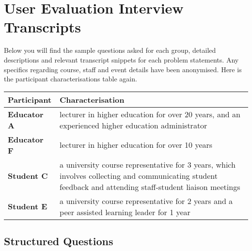 
\chapter{User Evaluation Interview Transcripts}

Below you will find the sample questions asked for each group, detailed descriptions and relevant transcript
snippets for each problem statements.
Any specifics regarding course, staff and event details have been anonymised.
Here is the participant characterisations table again.

\begin{table}[!h]
	\centering
	\begin{tabularx}{\textwidth}{>{\bfseries}lX}
		Participant & Characterisation                                                                    \\
		\toprule
		Educator A  & lecturer in higher education for over 20 years, and an experienced higher education
		administrator                                                                                     \\\midrule
		Educator F  & lecturer in higher education for over 10 years                                      \\\midrule
		Student C   & a university course representative for 3 years, which involves collecting and
		communicating student feedback and attending staff-student liaison meetings                       \\\midrule
		Student E   & a university course representative for 2 years and a peer assisted learning leader
		for 1 year                                                                                        \\\bottomrule
	\end{tabularx}
\end{table}

\section{Structured Questions}

